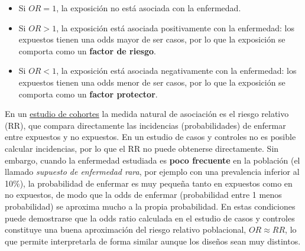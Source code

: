 \documentclass[
  spanish,
  a4paper,
]{scrreport}
\providecommand{\tightlist}{%
  \setlength{\itemsep}{0pt}\setlength{\parskip}{0pt}}
\theoremstyle{definition}
\theoremstyle{definition}
\theoremstyle{remark}
\begin{document}
\begin{tcolorbox}[enhanced jigsaw, arc=.35mm, bottomrule=.15mm, bottomtitle=1mm, breakable, colback=white, colbacktitle=quarto-callout-note-color!10!white, colframe=quarto-callout-note-color-frame, coltitle=black, left=2mm, leftrule=.75mm, opacityback=0, opacitybacktitle=0.6, rightrule=.15mm, title=\textcolor{quarto-callout-note-color}{\faInfo}\hspace{0.5em}{Interpretación}, titlerule=0mm, toprule=.15mm, toptitle=1mm]

\begin{itemize}
\tightlist
\item
  Si \(OR=1\), la exposición no está asociada con la enfermedad.
\item
  Si \(OR>1\), la exposición está asociada positivamente con la
  enfermedad: los expuestos tienen una odds mayor de ser casos, por lo
  que la exposición se comporta como un \textbf{factor de riesgo}.
\item
  Si \(OR<1\), la exposición está asociada negativamente con la
  enfermedad: los expuestos tienen una odds menor de ser casos, por lo
  que la exposición se comporta como un \textbf{factor protector}.
\end{itemize}

\end{tcolorbox}

\begin{tcolorbox}[enhanced jigsaw, arc=.35mm, bottomrule=.15mm, bottomtitle=1mm, breakable, colback=white, colbacktitle=quarto-callout-note-color!10!white, colframe=quarto-callout-note-color-frame, coltitle=black, left=2mm, leftrule=.75mm, opacityback=0, opacitybacktitle=0.6, rightrule=.15mm, title=\textcolor{quarto-callout-note-color}{\faInfo}\hspace{0.5em}{Relación con el riesgo relativo}, titlerule=0mm, toprule=.15mm, toptitle=1mm]

En un \hyperref[estudios-de-cohortes]{estudio de cohortes} la medida
natural de asociación es el riesgo relativo (RR), que compara
directamente las incidencias (probabilidades) de enfermar entre
expuestos y no expuestos. En un estudio de casos y controles no es
posible calcular incidencias, por lo que el RR no puede obtenerse
directamente. Sin embargo, cuando la enfermedad estudiada es
\textbf{poco frecuente} en la población (el llamado \emph{supuesto de
enfermedad rara}, por ejemplo con una prevalencia inferior al 10\%), la
probabilidad de enfermar es muy pequeña tanto en expuestos como en no
expuestos, de modo que la odds de enfermar (probabilidad entre 1 menos
probabilidad) se aproxima mucho a la propia probabilidad. En estas
condiciones puede demostrarse que la odds ratio calculada en el estudio
de casos y controles constituye una buena aproximación del riesgo
relativo poblacional, \(OR \approx RR\), lo que permite interpretarla de
forma similar aunque los diseños sean muy distintos.

\end{tcolorbox}
\end{document}
